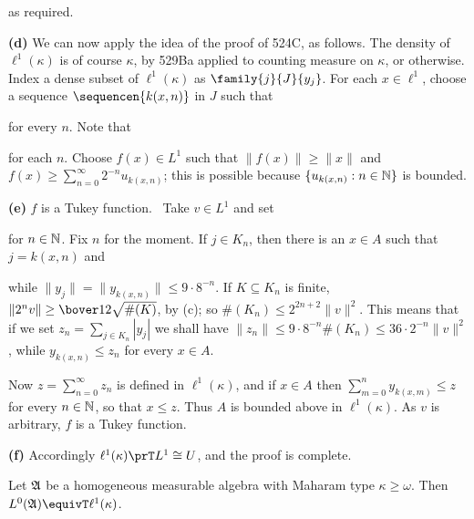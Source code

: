 {\noindent as required.\ \Qed

\medskip

{\bf (d)} We can now apply the idea of the proof of 524C, as follows.
The density of $\ell^1(\kappa)$ is of course $\kappa$, by 529Ba applied
to counting measure on $\kappa$, or otherwise.
Index a dense subset of $\ell^1(\kappa)$ as
$\family{j}{J}{y_j}$.   For each $x\in\ell^1$, choose a sequence
$\sequencen{k(x,n)}$ in $J$ such that


\noindent for every $n$.   Note that


\noindent for each $n$.
Choose $f(x)\in L^1$ such that $\|f(x)\|\ge\|x\|$ and
$f(x)\ge\sum_{n=0}^{\infty}2^{-n}u_{k(x,n)}$;
this is possible because $\{u_{k(x,n)}:n\in\Bbb N\}$ is bounded.

\medskip

{\bf (e)} $f$ is a Tukey function.   \Prf\ Take $v\in L^1$ and set


\noindent for $n\in\Bbb N$.   Fix $n$ for the moment.   If $j\in K_n$,
then there is an $x\in A$ such that $j=k(x,n)$ and


\noindent while $\|y_j\|=\|y_{k(x,n)}\|\le 9\cdot 8^{-n}$.   If
$K\subseteq K_n$ is finite, $\|2^nv\|\ge\bover12\sqrt{\#(K)}$, by (c);
so $\#(K_n)\le 2^{2n+2}\|v\|^2$.   This means that if we set
$z_n=\sum_{j\in K_n}|y_j|$ we shall have
$\|z_n\|\le 9\cdot 8^{-n}\#(K_n)\le 36\cdot 2^{-n}\|v\|^2$, while
$y_{k(x,n)}\le z_n$ for every $x\in A$.

Now $z=\sum_{n=0}^{\infty}z_n$ is defined in $\ell^1(\kappa)$, and if
$x\in A$ then $\sum_{m=0}^ny_{k(x,m)}\le z$ for every $n\in\Bbb N$, so
that $x\le z$.   Thus $A$ is bounded above in $\ell^1(\kappa)$.   As $v$
is arbitrary, $f$ is a Tukey function.\ \Qed

\medskip

{\bf (f)} Accordingly $\ell^1(\kappa)\prT L^1\cong U$, and the proof is
complete.
}%

 Let $\frak A$ be a
homogeneous measurable algebra with Maharam type $\kappa\ge\omega$.  Then
$L^0(\frak A)\equivT\ell^1(\kappa)$.

